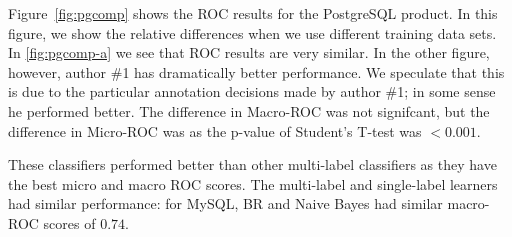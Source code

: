 \documentclass[smallextended]{svjour3}       %
\begin{document}
Figure~\ref{fig:pgcomp} shows the ROC results for the PostgreSQL
product. In this figure, we show the relative differences when we use
different training data sets. In \ref{fig:pgcomp-a} we see that ROC
results are very similar. In the other figure, however, author \#1 has
dramatically better performance. We speculate that this is due to the
particular annotation decisions made by author \#1; in some sense he
performed better. 
The difference in Macro-ROC was not signifcant, but the difference in
Micro-ROC was as the p-value of Student's T-test was $< 0.001$. 

These classifiers performed better than other multi-label classifiers as they have the best micro and macro ROC scores. 
The multi-label and single-label learners had similar performance: for
MySQL, BR and Naive Bayes had similar macro-ROC scores of $0.74$.
\end{document}

